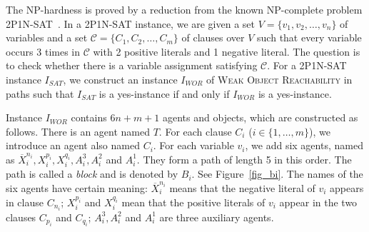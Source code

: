 
The NP-hardness is proved by a reduction from the known NP-complete problem \textsc{2P1N-SAT}~\citep{yoshinaka2005higher}.
In a \textsc{2P1N-SAT} instance, we are given a set $V=\{ v_1,v_2,\dots,v_n\}$ of variables and a set $\mathcal{C}=\{C_1,C_2,\dots,C_m\}$ of clauses over $V$ such that every variable occurs 3 times in $\mathcal{C}$ with 2 positive literals and 1 negative literal.  The question is to check whether there is a variable assignment satisfying $\mathcal{C}$.
For a \textsc{2P1N-SAT} instance $I_{SAT}$, we construct an instance $I_{WOR}$ of \textsc{Weak Object Reachability} in paths such that $I_{SAT}$ is a yes-instance if and only if $I_{WOR}$ is a yes-instance.

Instance $I_{WOR}$ contains $6n+m+1$ agents and objects, which are constructed as follows.
There is an agent named $T$.
For each clause $C_i$ ($i\in\{1,\dots,m\}$), we introduce an agent also named $C_i$.
For each variable $v_i$, we add six agents, named as  $\overline{X}_i^{n_i}, {X}_i^{p_i},{X}_i^{q_i}, A_i^3, A_i^2$ and $A_i^1$. They form a path of length 5 in this order.
The path is called a \emph{block} and is denoted by $B_i$. See Figure~\ref{fig_bi}.
The names of the six agents have certain meaning: $\overline{X}_i^{n_i}$ means that the negative literal of $v_i$ appears in clause $C_{n_i}$;
${X}_i^{p_i}$ and ${X}_i^{q_i}$ mean that the positive literals of $v_i$ appear in the two clauses $C_{p_i}$ and $C_{q_i}$;  $A_i^3, A_i^2$ and $A_i^1$ are three auxiliary agents.

